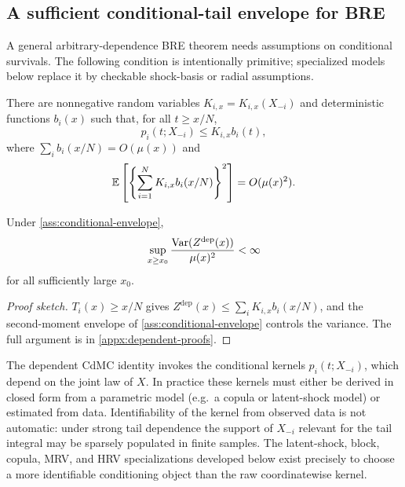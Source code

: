 \subsection{A sufficient conditional-tail envelope for BRE}

A general arbitrary-dependence BRE theorem needs assumptions on conditional
survivals. The following condition is intentionally primitive; specialized
models below replace it by checkable shock-basis or radial assumptions.

\begin{assumption}
\label{ass:conditional-envelope}
There are nonnegative random variables \(K_{i,x}=K_{i,x}(X_{-i})\) and
deterministic functions \(b_i(x)\) such that, for all \(t\ge x/N\),
\[
  p_i(t;X_{-i})\le K_{i,x}b_i(t),
\]
where \(\sum_i b_i(x/N)=O(\mu(x))\) and
\[
  \mathbb{E}\left[\left\{\sum_{i=1}^N K_{i,x}b_i(x/N)\right\}^2\right]
  =O(\mu(x)^2).
\]
\end{assumption}

\begin{proposition}
\label{prop:dep-envelope-bre}
Under \cref{ass:conditional-envelope},
\[
  \sup_{x\ge x_0}
  \frac{\operatorname{Var}(Z^{\mathrm{dep}}(x))}{\mu(x)^2}<\infty
\]
for all sufficiently large \(x_0\).
\end{proposition}

\begin{proof}[Proof sketch]
$T_i(x)\ge x/N$ gives $Z^{\mathrm{dep}}(x)\le\sum_i K_{i,x}b_i(x/N)$, and the
second-moment envelope of \cref{ass:conditional-envelope} controls the
variance. The full argument is in \cref{appx:dependent-proofs}.
\end{proof}

\begin{remark}
\label{rem:kernel-identifiability}
The dependent CdMC identity invokes the conditional kernels
$p_i(t;X_{-i})$, which depend on the joint law of $X$. In practice these
kernels must either be derived in closed form from a parametric model (e.g.\ a
copula or latent-shock model) or estimated from data. Identifiability of the
kernel from observed data is not automatic: under strong tail dependence the
support of $X_{-i}$ relevant for the tail integral may be sparsely populated
in finite samples. The latent-shock, block, copula, MRV, and HRV
specializations developed below exist precisely to choose a more identifiable
conditioning object than the raw coordinatewise kernel.
\end{remark}

